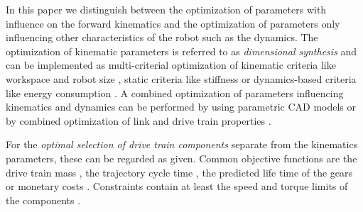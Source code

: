 \documentclass{svproc}
\begin{document}
In this paper we distinguish between the optimization of parameters with influence on the forward kinematics and the optimization of parameters only influencing other characteristics of the robot such as the dynamics.
The optimization of kinematic parameters is referred to as \emph{dimensional synthesis} and can be implemented as multi-criterial optimization of kinematic criteria like workspace and robot size \cite{CeccarelliLan2004}, static criteria like stiffness \cite{CarboneOttCec2007} or dynamics-based criteria like energy consumption \cite{RamirezKotOrt2017}.
A combined optimization of parameters influencing kinematics and dynamics can be performed by using parametric CAD models \cite{TarkianLunOel2008,ZhouBai2015} or by combined optimization of link and drive train properties \cite{ShillerSun1991}.


For the \emph{optimal selection of drive train components} separate from the kinematics parameters, these can be regarded as given. %
Common objective functions are the drive train mass \cite{ChedmailGau1990,PetterssonOel2009,ZhouBaiHan2011}, the trajectory cycle time \cite{TarkianPerOelFen2011}, the predicted life time of the gears \cite{PetterssonAndKru2005} or monetary costs \cite{PetterssonAndKru2005}.
Constraints contain at least the speed and torque limits of the components \cite {ChedmailGau1990,PetterssonOel2009,ZhouBaiHan2011}.
\end{document}
